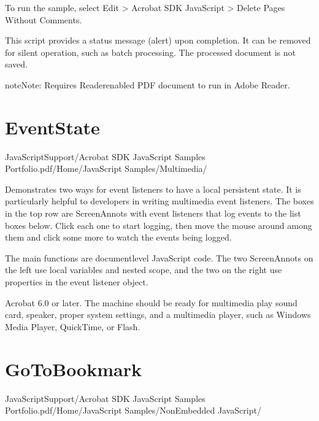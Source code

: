 \documentclass[letterpaper,12pt,english,openany,oneside]{sphinxmanual}
\begin{document}
To run the sample, select Edit > Acrobat SDK JavaScript > Delete Pages Without Comments.

This script provides a status message (alert) upon completion. It can be removed for silent operation, such as batch processing. The processed document is not saved.

\begin{sphinxadmonition}{note}{Note:}
Requires Reader\sphinxhyphen{}enabled PDF document to run in Adobe Reader.
\end{sphinxadmonition}


\section{EventState}
\label{\detokenize{Samples_JavaScript:eventstate}}\label{\detokenize{Samples_JavaScript:location-8}}

JavaScriptSupport/Acrobat SDK JavaScript Samples Portfolio.pdf/Home/JavaScript Samples/Multimedia/

\label{\detokenize{Samples_JavaScript:description-8}}

Demonstrates two ways for event listeners to have a local persistent state. It is particularly helpful to developers in writing multimedia event listeners. The boxes in the top row are ScreenAnnots with event listeners that log events to the list boxes below. Click each one to start logging, then move the mouse around among them and click some more to watch the events being logged.

The main functions are document\sphinxhyphen{}level JavaScript code. The two ScreenAnnots on the left use local variables and nested scope, and the two on the right use properties in the event listener object.

 Acrobat 6.0 or later. The machine should be ready for multimedia play \sphinxhyphen{} sound card, speaker, proper system settings, and a multimedia player, such as Windows Media Player, QuickTime, or Flash.


\section{GoToBookmark}
\label{\detokenize{Samples_JavaScript:gotobookmark}}\label{\detokenize{Samples_JavaScript:location-9}}

JavaScriptSupport/Acrobat SDK JavaScript Samples Portfolio.pdf/Home/JavaScript Samples/Non\sphinxhyphen{}Embedded JavaScript/
\end{document}

